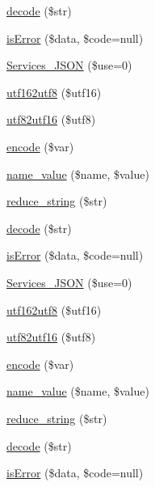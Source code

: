 \begin{DoxyCompactItemize}
\item 
\hyperlink{class_services___j_s_o_n_a4afbb486f4a5ff5a8170c832f5997986}{decode} (\$str)
\item 
\hyperlink{class_services___j_s_o_n_a55ae0955466c3970507b122f3f5d1b38}{is\-Error} (\$data, \$code=null)
\item 
\hyperlink{class_services___j_s_o_n_abc84bd855fe129a4c68bcb68b4d17108}{Services\-\_\-\-J\-S\-O\-N} (\$use=0)
\item 
\hyperlink{class_services___j_s_o_n_aa7b1b36cd3a4995bbb60f5def6a216e2}{utf162utf8} (\$utf16)
\item 
\hyperlink{class_services___j_s_o_n_af9687bbf6bcddc9c847d608f9a1fa4c0}{utf82utf16} (\$utf8)
\item 
\hyperlink{class_services___j_s_o_n_acdf1c85111e34b3048d436228bf39819}{encode} (\$var)
\item 
\hyperlink{class_services___j_s_o_n_aa7f3e18209717e584f01f53a0325e9ff}{name\-\_\-value} (\$name, \$value)
\item 
\hyperlink{class_services___j_s_o_n_ae463a3baa44e95fa5b5151ab2334df1c}{reduce\-\_\-string} (\$str)
\item 
\hyperlink{class_services___j_s_o_n_a4afbb486f4a5ff5a8170c832f5997986}{decode} (\$str)
\item 
\hyperlink{class_services___j_s_o_n_a55ae0955466c3970507b122f3f5d1b38}{is\-Error} (\$data, \$code=null)
\item 
\hyperlink{class_services___j_s_o_n_abc84bd855fe129a4c68bcb68b4d17108}{Services\-\_\-\-J\-S\-O\-N} (\$use=0)
\item 
\hyperlink{class_services___j_s_o_n_aa7b1b36cd3a4995bbb60f5def6a216e2}{utf162utf8} (\$utf16)
\item 
\hyperlink{class_services___j_s_o_n_af9687bbf6bcddc9c847d608f9a1fa4c0}{utf82utf16} (\$utf8)
\item 
\hyperlink{class_services___j_s_o_n_acdf1c85111e34b3048d436228bf39819}{encode} (\$var)
\item 
\hyperlink{class_services___j_s_o_n_aa7f3e18209717e584f01f53a0325e9ff}{name\-\_\-value} (\$name, \$value)
\item 
\hyperlink{class_services___j_s_o_n_ae463a3baa44e95fa5b5151ab2334df1c}{reduce\-\_\-string} (\$str)
\item 
\hyperlink{class_services___j_s_o_n_a4afbb486f4a5ff5a8170c832f5997986}{decode} (\$str)
\item 
\hyperlink{class_services___j_s_o_n_a55ae0955466c3970507b122f3f5d1b38}{is\-Error} (\$data, \$code=null)
\item 

\end{DoxyCompactItemize}

